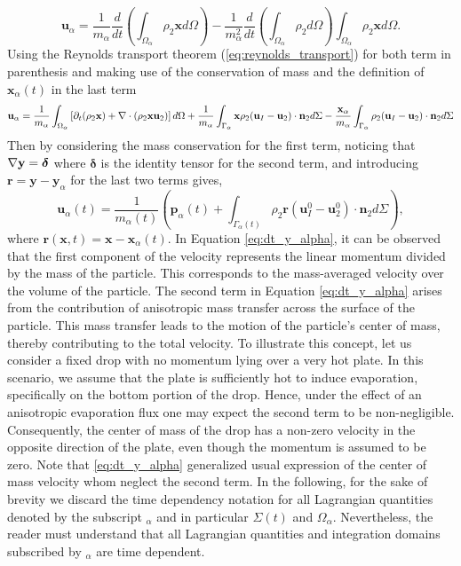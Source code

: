 \begin{equation}
    \textbf{u}_\alpha = \frac{1}{m_\alpha}
    \frac{d}{dt} 
    \left(
        \int_{\Omega_\alpha} \rho_2 \textbf{x} d\Omega
    \right)
    - \frac{1}{m_\alpha^2} \frac{d}{dt} \left(\int_{\Omega_\alpha} \rho_2 d\Omega \right)\int_{\Omega_\alpha} \rho_2 \textbf{x} d\Omega.
\end{equation}
Using the Reynolds transport theorem (\ref{eq:reynolds_transport}) for both term in parenthesis and making use of the conservation of mass and the definition of $\textbf{x}_\alpha(t)$ in the last term
\begin{equation}
    \textbf{u}_\alpha = 
    \frac{1}{m_\alpha}\int_{\Omega_\alpha}  \left[
        \partial_t (\rho_2 \textbf{x}) + \mathbf{\nabla}\cdot\left(\rho_2 \textbf{x}\textbf{u}_2\right) 
    \right] d\Omega \\
    + \frac{1}{m_\alpha}\int_{\Gamma_\alpha}  \textbf{x} \rho_2(\textbf{u}_I   - \textbf{u}_2) \cdot \textbf{n}_2  d\Sigma
    -  \frac{\textbf{x}_\alpha}{m_\alpha}    \int_{\Gamma_\alpha}  \rho_2(\textbf{u}_I   - \textbf{u}_2) \cdot \textbf{n}_2  d\Sigma
\end{equation}
Then by considering the mass conservation for the first term, noticing that $\mathbf{\nabla} \textbf{y} = \bm\delta$ where $\bm\delta$ is the identity tensor for the second term, and introducing $\mathbf{r} = \mathbf{y} - \mathbf{y}_\alpha$ for the last two terms gives, 
\begin{equation}
    \textbf{u}_\alpha(t) = \frac{1}{m_\alpha(t)} \left(
        \textbf{p}_\alpha(t)
        +  \int_{\Gamma_\alpha(t)} \rho_2 \textbf{r} (\textbf{u}_I^0 - \textbf{u}_2^0)\cdot \textbf{n}_2 d\Sigma
        \right),
        \label{eq:dt_y_alpha}
\end{equation}
where $\textbf{r}(\textbf{x},t) = \textbf{x} - \textbf{x}_\alpha(t)$. 
In Equation \ref{eq:dt_y_alpha}, it can be observed that the first component of the velocity represents the linear momentum divided by the mass of the particle. 
This corresponds to the mass-averaged velocity over the volume of the particle.
The second term in Equation \ref{eq:dt_y_alpha} arises from the contribution of anisotropic mass transfer across the surface of the particle. 
This mass transfer leads to the motion of the particle's center of mass, thereby contributing to the total velocity.
To illustrate this concept, let us consider a fixed drop with no momentum lying over a very hot plate.
In this scenario, we assume that the plate is sufficiently hot to induce evaporation, specifically on the bottom portion of the drop.
Hence, under the effect of an anisotropic evaporation flux one may expect the second term to be non-negligible.
Consequently, the center of mass of the drop has a non-zero velocity in the opposite direction of the plate, even though the momentum is assumed to be zero.
Note that \ref{eq:dt_y_alpha} generalized usual expression of the center of mass velocity whom neglect the second term.
In the following, for the sake of brevity we discard the time dependency notation for all Lagrangian quantities denoted by the subscript $_\alpha$ and in particular $\Sigma(t)$ and $\Omega_\alpha$.
Nevertheless, the reader must understand that all Lagrangian quantities and integration domains subscribed by $_\alpha$ are time dependent. 

